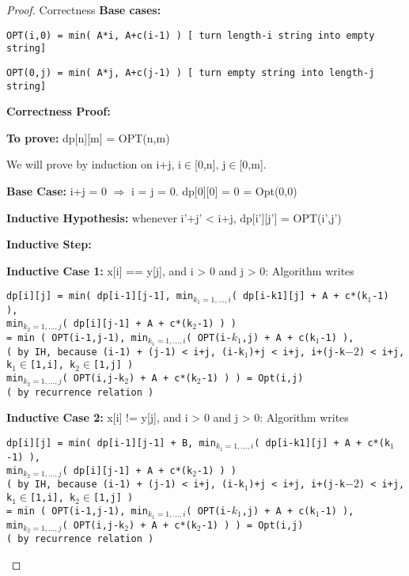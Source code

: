 \documentclass[openany]{article}
\begin{document}
\begin{proof}{Correctness}
   \textbf{Base cases:}
   \begin{center}
        \texttt{OPT(i,0) = min( A*i, A+c(i-1) ) [ turn length-i string into empty string]}
        
        \texttt{OPT(0,j) = min( A*j, A+c(j-1) ) [ turn empty string into length-j string]}
   \end{center}

    \textbf{Correctness Proof:}
    
    \textbf{To prove:} dp[n][m] = OPT(n,m)
    
    We will prove by induction on i+j, i$\in$[0,n], j$\in$[0,m].
    
    \textbf{Base Case:} i+j = 0 $\Rightarrow$ i = j = 0. dp[0][0] = 0 = Opt(0,0)
    
    \textbf{Inductive Hypothesis:} whenever i'+j' < i+j, dp[i'][j'] = OPT(i',j')
    
    \textbf{Inductive Step:}
    
    \textbf{Inductive Case 1:}  x[i] == y[j], and i > 0 and j > 0:
    Algorithm writes 
    \begin{center}
        \texttt{dp[i][j] = min( dp[i-1][j-1], min$_{k_1=1,...,i}$( dp[i-k1][j] + A + c*(k$_1$-1) ),\\min$_{k_2=1,...,j}$( dp[i][j-1] + A + c*(k$_2$-1) ) )\\
        = min ( OPT(i-1,j-1), min$_{k_1=1,...,i}$( OPT(i-$k_1$,j) + A + c(k$_1$-1) ), \\( by IH, because (i-1) + (j-1) < i+j, (i-k$_1$)+j < i+j, i+(j-k$-2$) < i+j, k$_1$$\in$[1,i], k$_2$$\in$[1,j] ) \\min$_{k_2=1,...,j}$( OPT(i,j-k$_2$) + A + c*(k$_2$-1) ) ) = Opt(i,j) \\( by recurrence relation )}
    \end{center}

    \textbf{Inductive Case 2:}  x[i] != y[j], and i > 0 and j > 0:
    Algorithm writes 
    \begin{center}
        \texttt{dp[i][j] = min( dp[i-1][j-1] + B, min$_{k_1=1,...,i}$( dp[i-k1][j] + A + c*(k$_1$-1) ),\\min$_{k_2=1,...,j}$( dp[i][j-1] + A + c*(k$_2$-1) ) ) \\( by IH, because (i-1) + (j-1) < i+j, (i-k$_1$)+j < i+j, i+(j-k$-2$) < i+j, k$_1$$\in$[1,i], k$_2$$\in$[1,j] )\\
= min ( OPT(i-1,j-1), min$_{k_1=1,...,i}$( OPT(i-$k_1$,j) + A + c(k$_1$-1) ), \\min$_{k_2=1,...,j}$( OPT(i,j-k$_2$) + A + c*(k$_2$-1) ) ) = Opt(i,j) \\( by recurrence relation ) }
    \end{center}


\end{proof}
\end{document}
